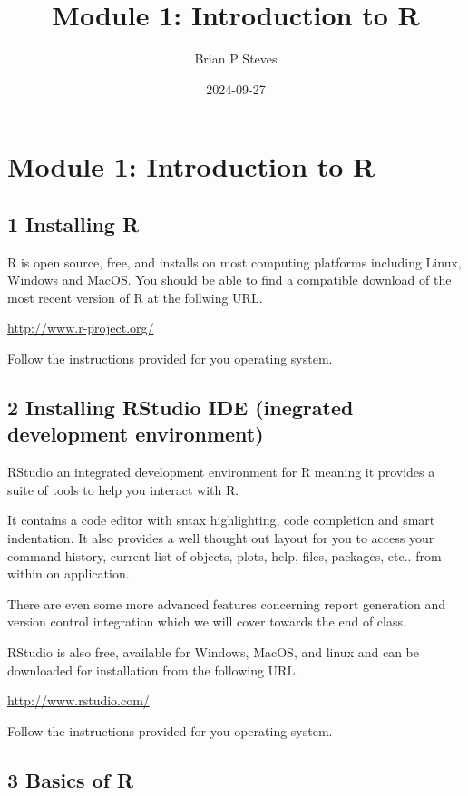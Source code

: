 \documentclass[
]{article}
\title{Module 1: Introduction to R}
\author{Brian P Steves}
\date{2024-09-27}
\begin{document}
\maketitle

\section{Module 1: Introduction to R}\label{module-1-introduction-to-r}

\subsection{1 Installing R}\label{installing-r}

R is open source, free, and installs on most computing platforms
including Linux, Windows and MacOS. You should be able to find a
compatible download of the most recent version of R at the follwing URL.

\url{http://www.r-project.org/}

Follow the instructions provided for you operating system.

\subsection{2 Installing RStudio IDE (inegrated development
environment)}\label{installing-rstudio-ide-inegrated-development-environment}

RStudio an integrated development environment for R meaning it provides
a suite of tools to help you interact with R.

It contains a code editor with sntax highlighting, code completion and
smart indentation. It also provides a well thought out layout for you to
access your command history, current list of objects, plots, help,
files, packages, etc.. from within on application.

There are even some more advanced features concerning report generation
and version control integration which we will cover towards the end of
class.

RStudio is also free, available for Windows, MacOS, and linux and can be
downloaded for installation from the following URL.

\url{http://www.rstudio.com/}

Follow the instructions provided for you operating system.

\subsection{3 Basics of R}\label{basics-of-r}
\end{document}
